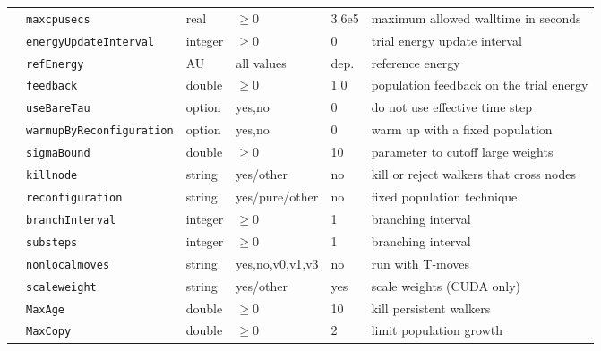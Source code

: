 \begin{table}[h]
\begin{center}
\begin{tabularx}{\textwidth}{l l l l l X }
   &   \texttt{maxcpusecs          } &  real  & $\ge 0$ & 3.6e5   & maximum allowed walltime in seconds \\
   &   \texttt{energyUpdateInterval} &  integer  & $\ge 0$ & 0   & trial energy update interval \\
   &   \texttt{refEnergy           } &  AU  & all values & dep.   & reference energy  \\
   &   \texttt{feedback            } &  double  & $\ge 0$ & 1.0   & population feedback on the trial energy \\
   &   \texttt{useBareTau          } &  option  & yes,no & 0   & do not use effective time step  \\
   &   \texttt{warmupByReconfiguration} &  option  & yes,no & 0   & warm up with a fixed population  \\
   &   \texttt{sigmaBound          } &  double  & $\ge 0$  & 10   & parameter to cutoff large weights  \\
   &   \texttt{killnode            } &  string  & yes/other & no   & kill or reject walkers that cross nodes  \\
   &   \texttt{reconfiguration     } &  string  & yes/pure/other & no   & fixed population technique  \\
   &   \texttt{branchInterval      } &  integer  & $\ge 0$ & 1   & branching interval \\
   &   \texttt{substeps            } &  integer  & $\ge 0$ & 1   & branching interval \\
   &   \texttt{nonlocalmoves       } &  string  & yes,no,v0,v1,v3 & no   & run with T-moves  \\
   &   \texttt{scaleweight         } &  string  & yes/other & yes   & scale weights (CUDA only)  \\
   &   \texttt{MaxAge              } &  double  & $\ge 0$ & 10   & kill persistent walkers  \\
    &   \texttt{MaxCopy             } &  double  & $\ge 0$ &2   & limit population growth \\

\end{tabularx}
\end{center}
\end{table}

